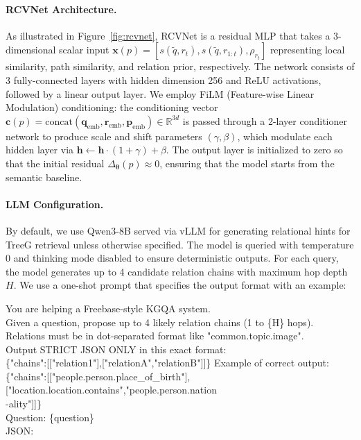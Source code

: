 \documentclass{article}
\theoremstyle{plain}
\theoremstyle{definition}
\theoremstyle{remark}
\begin{document}
\paragraph{RCVNet Architecture.}
As illustrated in Figure~\ref{fig:rcvnet}, RCVNet is a residual MLP that takes a 3-dimensional scalar input $\mathbf{x}(p) = [s(\tilde{q}, r_t), s(\tilde{q}, r_{1:t}), \rho_{r_t}]$ representing local similarity, path similarity, and relation prior, respectively. The network consists of 3 fully-connected layers with hidden dimension 256 and ReLU activations, followed by a linear output layer. We employ FiLM (Feature-wise Linear Modulation) conditioning: the conditioning vector $\mathbf{c}(p) = \text{concat}(\mathbf{q}_{\text{emb}}, \mathbf{r}_{\text{emb}}, \mathbf{p}_{\text{emb}}) \in \mathbb{R}^{3d}$ is passed through a 2-layer conditioner network to produce scale and shift parameters $(\gamma, \beta)$, which modulate each hidden layer via $\mathbf{h} \leftarrow \mathbf{h} \cdot (1 + \gamma) + \beta$. The output layer is initialized to zero so that the initial residual $\Delta_{\bm\theta}(p) \approx 0$, ensuring that the model starts from the semantic baseline.
\paragraph{LLM Configuration.}
By default, we use Qwen3-8B served via vLLM for generating relational hints for TreeG retrieval unless otherwise specified. The model is queried with temperature 0 and thinking mode disabled to ensure deterministic outputs. For each query, the model generates up to 4 candidate relation chains with maximum hop depth $H$. We use a one-shot prompt that specifies the output format with an example:

{\fontsize{8pt}{6pt}\ttfamily 
You are helping a Freebase-style KGQA system.\\
Given a question, propose up to 4 likely relation chains (1 to \{H\} hops).\\
Relations must be in dot-separated format like "common.topic.image".\\
Output STRICT JSON ONLY in this exact format:\\
\{"chains":[["relation1"],["relationA","relationB"]]\}
Example of correct output:\\
\{"chains":[["people.person.place\_of\_birth"], 
["location.location.contains","people.person.nation\\-ality"]]\}\\
Question: \{question\}\\
JSON:}
\end{document}
